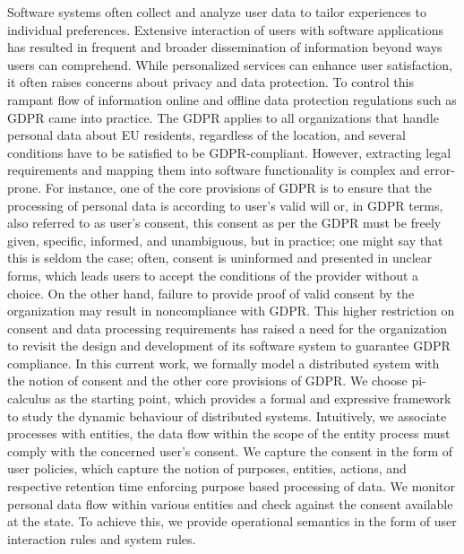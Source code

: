 Software systems often collect and analyze user data to tailor experiences to individual preferences. Extensive interaction of users with software applications has resulted in frequent and broader dissemination of information beyond ways users can comprehend. While personalized services can enhance user satisfaction, it often raises concerns about privacy and data protection. To control this rampant flow of information online and offline data protection regulations such as GDPR came into practice. The GDPR applies to all organizations that handle personal data about EU residents, regardless of the location, and several conditions have to be satisfied to be GDPR-compliant. However, extracting legal requirements and mapping them into software functionality is complex and error-prone. 
For instance, one of the core provisions of GDPR is to ensure that the processing of personal data is according to user's valid will or, in GDPR terms, also referred to as user's consent, this consent as per the GDPR  must be freely given, specific, informed, and unambiguous, but in practice; one might say that this is seldom the case; often, consent is uninformed and presented in unclear forms, which leads users to accept the conditions of the provider without a choice. On the other hand, failure to provide proof of valid consent by the organization may result in noncompliance with GDPR. This higher restriction on consent and data processing requirements has raised a need for the organization to revisit the design and development of its software system to guarantee GDPR compliance.
 In this current work, 
we formally model a distributed system with the notion of consent and the other core provisions of GDPR.  We choose pi-calculus as the starting point, which provides a formal and expressive framework to study the dynamic behaviour of distributed %
systems. %
Intuitively, we associate processes with entities, the data flow within the scope of the entity process must comply with the concerned user's consent. We capture the consent in the form of user policies, which capture the notion of purposes, entities, actions, and respective retention time %
enforcing purpose based processing of data. We monitor personal data flow within various entities and check against the consent available at the state. To achieve this, we provide operational semantics in the form of user interaction rules and system rules. 

